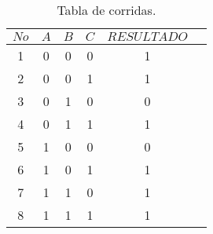 \begin{table}[!ht]
\label{T:equipos}
\begin{center}
\begin{tabular}{| c | c | c | c | c | c |}
\hline
\textbf{$No$} & \textbf{$A$} &  \textbf{$B$} & \textbf{$C$} & \textbf{$RESULTADO$}\\
\hline
1 & 0 & 0 & 0 & 1\\
2 & 0 & 0 & 1 & 1 \\
3 & 0 & 1 & 0 &  0\\
4 & 0 & 1 & 1 & 1 \\
5 & 1 & 0 & 0 & 0 \\
6 & 1 & 0 & 1 & 1 \\
7 & 1 & 1 & 0 & 1  \\
8 & 1 & 1 & 1 & 1 \\
\hline
\end{tabular}
\caption{Tabla de corridas.}
\end{center}
\end{table}\\




